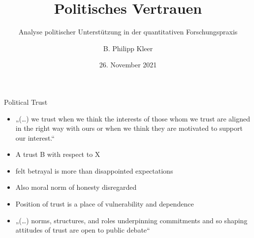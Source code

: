 \documentclass[11pt]{beamer}
\title{Politisches Vertrauen}
\subtitle{Analyse politischer Unterstützung in der quantitativen Forschungspraxis}
\date{26. November 2021}
\author{B. Philipp Kleer}
\institute{Institut für Politikwissenschaft | Justus-Liebig-Universität Gießen}
\begin{document}
\begin{frame}
\titlepage
\end{frame}

%

\begin{frame}[t]{Political Trust}
\begin{itemize}
	\item „(…) we trust when we think the interests of those whom we trust are aligned in the right way with ours or when we think they are motivated to support our interest.“ \parencite[447]{Festenstein2019} \pause
	\item A trust B with respect to X \parencite[449]{Festenstein2019} \pause
	\item felt betrayal is more than disappointed expectations \parencite[450]{Festenstein2019} \pause
	\item Also moral norm of honesty disregarded \pause
	\item Position of trust is a place of vulnerability and dependence \parencite[451]{Festenstein2019} \pause
	\item „(…) norms, structures, and roles underpinning commitments and so shaping attitudes of trust are open to public debate“ \parencite[454]{Festenstein2019} \pause
	\end{itemize}

\end{frame}
\end{document}
